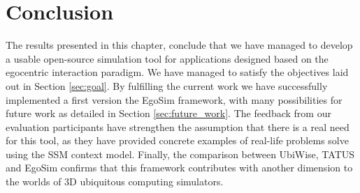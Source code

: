 \section{Conclusion} %
\label{sec:eval_conclusion}
The results presented in this chapter, conclude that we have managed to develop a usable open-source simulation tool for applications designed based on the egocentric interaction paradigm. We have managed to satisfy the objectives laid out in Section \ref{sec:goal}. By fulfilling the current work we have successfully implemented a first version the EgoSim framework, with many possibilities for future work as detailed in Section \ref{sec:future_work}. The feedback from our evaluation participants have strengthen the assumption that there is a real need for this tool, as they have provided concrete examples of real-life problems solve using the SSM context model. Finally, the comparison between UbiWise, TATUS and EgoSim confirms that this framework contributes with another dimension to the worlds of 3D ubiquitous computing simulators.
